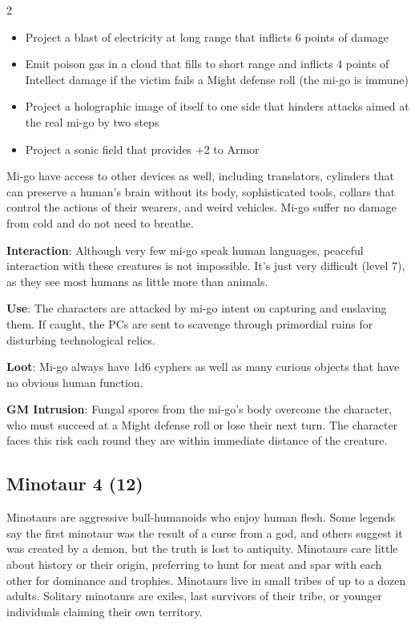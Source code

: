 \begin{multicols}{2}
\begin{itemize} 
\item Project a blast of electricity at long range that inflicts 6 points of damage
\item Emit poison gas in a cloud that fills to short range and inflicts 4 points of Intellect damage if the victim fails a Might defense roll (the mi-go is immune)
\item Project a holographic image of itself to one side that hinders attacks aimed at the real mi-go by two steps
\item Project a sonic field that provides +2 to Armor
\end{itemize}

Mi-go have access to other devices as well, including translators, cylinders that can preserve a human’s brain without its body, sophisticated tools, collars that control the actions of their wearers, and weird vehicles. Mi-go suffer no damage from cold and do not need to breathe.

\textbf{Interaction}: Although very few mi-go speak human languages, peaceful interaction with these creatures is not impossible. It’s just very difficult (level 7), as they see most humans as little more than animals.

\textbf{Use}: The characters are attacked by mi-go intent on capturing and enslaving them. If caught, the PCs are sent to scavenge through primordial ruins for disturbing technological relics.

\textbf{Loot}: Mi-go always have 1d6 cyphers as well as many curious objects that have no obvious human function.

\textbf{GM Intrusion}: Fungal spores from the mi-go’s body overcome the character, who must succeed at a Might defense roll or lose their next turn. The character faces this risk each round they are within immediate distance of the creature.

\subsection{Minotaur 4 (12)}

Minotaurs are aggressive bull-humanoids who enjoy human flesh. Some legends say the first minotaur was the result of a curse from a god, and others suggest it was created by a demon, but the truth is lost to antiquity. Minotaurs care little about history or their origin, preferring to hunt for meat and spar with each other for dominance and trophies. Minotaurs live in small tribes of up to a dozen adults. Solitary minotaurs are exiles, last survivors of their tribe, or younger individuals claiming their own territory. 


\end{multicols}
